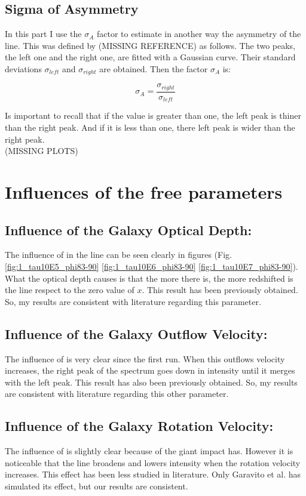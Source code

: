 \subsection{Sigma of Asymmetry}
In this part I use the $\sigma_A$ factor to estimate in another way the asymmetry of the \lya line. This was defined by (MISSING REFERENCE) as follows. The two peaks, the left one and the right one, are fitted with a Gaussian curve. Their standard deviations $\sigma_{left}$ and $\sigma_{right}$ are obtained. Then the factor $\sigma_A$ is:

\begin{equation}
\sigma_A = \frac{\sigma_{right}}{\sigma_{left}}
\end{equation}

Is important to recall that if the value is greater than one, the left peak is thiner than the right peak. And if it is less than one, there left peak is wider than the right peak.\\

(MISSING PLOTS)

\section{Influences of the free parameters}

\subsection{Influence of the Galaxy Optical Depth: \tauh}
The influence of \tauh in the \lya line can be seen clearly in figures (Fig. \ref{fig:1_tau10E5_phi83-90} \ref{fig:1_tau10E6_phi83-90} \ref{fig:1_tau10E7_phi83-90}). What the optical depth causes is that the more \tauh there is, the more redshifted is the line respect to the zero value of $x$. This result has been previously obtained. So, my results are consistent with literature regarding this parameter.\\

\subsection{Influence of the Galaxy Outflow Velocity: \vout}
The influence of \vout is very clear since the first run. When this outflows velocity increases, the right peak of the spectrum goes down in intensity until it merges with the left peak.  This result has also been previously obtained. So, my results are consistent with literature regarding this other parameter.\\

\subsection{Influence of the Galaxy Rotation Velocity: \vrot}
The influence of \vrot is slightly clear because of the giant impact \vout has. However it is noticeable that the \lya line broadens and lowers intensity when the rotation velocity increases. This effect has been less studied in literature. Only Garavito et al. \cite{Garavito14} has simulated its effect, but our results are consistent. 